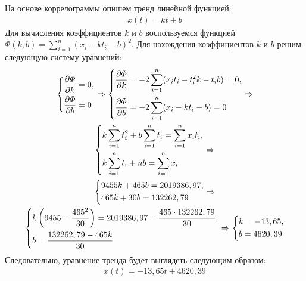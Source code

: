 \documentclass[utf8, a4paper, 14pt, russian, oneside]{book}
\begin{document}
На основе коррелограммы опишем тренд линейной функцией:
\begin{gather*}
    x(t) = kt + b
\end{gather*}
Для вычисления коэффициентов $k$ и $b$ воспользуемся функцией $\varPhi(k, b) = \sum\limits_{i=1}^n (x_i - kt_i -b)^2$. Для нахождения коэффициентов $k$ и $b$ решим следующую систему уравнений:
\begin{gather*}
    \begin{dcases}
         \frac{\partial \varPhi}{\partial k}  = 0, \\
         \frac{\partial \varPhi}{\partial b}  = 0
    \end{dcases}
    \Rightarrow
    \begin{dcases}
         \frac{\partial \varPhi}{\partial k}  = -2 \sum\limits_{i=1}^n (x_it_i - t_i^2k - t_ib) = 0, \\
         \frac{\partial \varPhi}{\partial b}  = -2 \sum\limits_{i=1}^n (x_i - kt_i - b) = 0
    \end{dcases}
    \Rightarrow \\
    \begin{dcases}
        k \sum\limits_{i=1}^n t_i^2 + b \sum\limits_{i=1}^n t_i = \sum\limits_{i=1}^n x_it_i, \\
        k \sum\limits_{i=1}^n t_i + nb = \sum\limits_{i=1}^n x_i
    \end{dcases}
    \Rightarrow \\
    \begin{dcases}
        9455k + 465b = 2019386,97, \\
        465k + 30 b = 132262,79 \\
    \end{dcases}
    \Rightarrow \\
    \begin{dcases}
        k\left(9455 - \frac{465^2}{30}\right) = 2019386,97 - \frac{465 \cdot 132262,79}{30}, \\
        b = \frac{132262,79 - 465k}{30}
    \end{dcases}
    \Rightarrow
    \begin{dcases}
        k = -13,65, \\
        b = 4620,39
    \end{dcases}
\end{gather*}
Следовательно, уравнение тренда будет выглядеть следующим образом:
\begin{gather*}
    x(t) = -13,65t + 4620,39
\end{gather*}
\newpage

\end{document}
